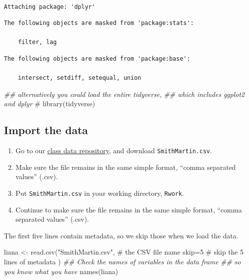 \documentclass[
  letterpaper,
  DIV=11,
  numbers=noendperiod]{scrreprt}
\newenvironment{Shaded}{\begin{snugshade}}{\end{snugshade}}
\newcommand{\AttributeTok}[1]{\textcolor[rgb]{0.40,0.45,0.13}{#1}}
\newcommand{\CommentTok}[1]{\textcolor[rgb]{0.37,0.37,0.37}{#1}}
\newcommand{\DecValTok}[1]{\textcolor[rgb]{0.68,0.00,0.00}{#1}}
\newcommand{\DocumentationTok}[1]{\textcolor[rgb]{0.37,0.37,0.37}{\textit{#1}}}
\newcommand{\FunctionTok}[1]{\textcolor[rgb]{0.28,0.35,0.67}{#1}}
\newcommand{\NormalTok}[1]{\textcolor[rgb]{0.00,0.23,0.31}{#1}}
\newcommand{\OtherTok}[1]{\textcolor[rgb]{0.00,0.23,0.31}{#1}}
\newcommand{\StringTok}[1]{\textcolor[rgb]{0.13,0.47,0.30}{#1}}
\providecommand{\tightlist}{%
  \setlength{\itemsep}{0pt}\setlength{\parskip}{0pt}}
\begin{document}
\begin{verbatim}

Attaching package: 'dplyr'
\end{verbatim}

\begin{verbatim}
The following objects are masked from 'package:stats':

    filter, lag
\end{verbatim}

\begin{verbatim}
The following objects are masked from 'package:base':

    intersect, setdiff, setequal, union
\end{verbatim}

\begin{Shaded}
\begin{Highlighting}[]
\DocumentationTok{\#\# alternatively you could load the entire tidyverse,}
\DocumentationTok{\#\# which includes ggplot2 and dplyr}
\CommentTok{\# library(tidyverse)}
\end{Highlighting}
\end{Shaded}

\subsection{Import the data}\label{import-the-data}

\begin{enumerate}
\def\labelenumi{\arabic{enumi}.}
\tightlist
\item
  Go to our
  \href{https://drive.google.com/drive/u/1/folders/1FR2FLiW3xyD4Er52YzVTToPZuXXReGRo}{class
  data repository}, and download \texttt{SmithMartin.csv}.
\item
  Make sure the file remains in the same simple format, ``comma
  separated values'' (.csv).
\item
  Put \texttt{SmithMartin.csv} in your working directory,
  \texttt{Rwork}.
\item
  Continue to make sure the file remains in the same simple format,
  ``comma separated values'' (.csv).
\end{enumerate}

The first five lines contain metadata, so we skip those when we load the
data.

\begin{Shaded}
\begin{Highlighting}[]
\NormalTok{liana }\OtherTok{\textless{}{-}} \FunctionTok{read.csv}\NormalTok{(}\StringTok{"SmithMartin.csv"}\NormalTok{, }\CommentTok{\# the CSV file name}
                  \AttributeTok{skip=}\DecValTok{5} \CommentTok{\# skip the 5 lines of metadata}
\NormalTok{                  )}
\DocumentationTok{\#\# Check the names of variables in the data frame }
\DocumentationTok{\#\# so you know what you have}
\FunctionTok{names}\NormalTok{(liana)}
\end{Highlighting}
\end{Shaded}
\end{document}

